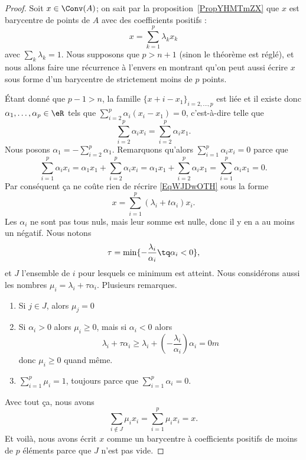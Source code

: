 \begin{proof}
	Soit \( x\in\Conv(A)\); on sait par la proposition~\ref{PropYHMTmZX} que \( x\) est barycentre de points de \( A\) avec des coefficients positifs :
	\begin{equation}    \label{EqWJDwOTH}
		x=\sum_{k=1}^p\lambda_kx_k
	\end{equation}
	avec \( \sum_k\lambda_k=1\). Nous supposons que \( p>n+1\) (sinon le théorème est réglé), et nous allons faire une récurrence à l'envers en montrant qu'on peut aussi écrire \( x\) sous forme d'un barycentre de strictement moins de \( p\) points.

	Étant donné que \( p-1>n\), la famille \( \{ x+i-x_1 \}_{i=2,\ldots, p}\) est liée et il existe donc \( \alpha_1,\ldots, \alpha_p\in \eR\) tels que \( \sum_{i=2}^p\alpha_i(x_i-x_1)=0\), c'est-à-dire telle que
	\begin{equation}
		\sum_{i=2}^p\alpha_ix_i=\sum_{i=2}^p\alpha_ix_1.
	\end{equation}
	Nous posons \( \alpha_1=-\sum_{i=2}^p\alpha_1\). Remarquons qu'alors \( \sum_{i=1}^p\alpha_ix_i=0\) parce que
	\begin{equation}
		\sum_{i=1}^p\alpha_ix_i=\alpha_1x_1+\sum_{i=2}^p\alpha_ix_i=\alpha_1x_1+\sum_{i=2}^p\alpha_ix_1=\sum_{i=1}^p\alpha_ix_1=0.
	\end{equation}
	Par conséquent ça ne coûte rien de récrire \eqref{EqWJDwOTH} sous la forme
	\begin{equation}
		x=\sum_{i=1}^p(\lambda_i+t\alpha_i)x_i.
	\end{equation}
	Les \( \alpha_i\) ne sont pas tous nuls, mais leur somme est nulle, donc il y en a au moins un négatif. Nous notons
	\begin{equation}
		\tau=\min\{ -\frac{ \lambda_i }{ \alpha_i }\tq \alpha_i<0 \},
	\end{equation}
	et \( J\) l'ensemble de \( i\) pour lesquels ce minimum est atteint. Nous considérons aussi les nombres \( \mu_i=\lambda_i+\tau\alpha_i\). Plusieurs remarques.
	\begin{enumerate}
		\item
		      Si \( j\in J\), alors \( \mu_j=0\)
		\item
		      Si \( \alpha_i>0\) alors \( \mu_i\geq 0\), mais si \( \alpha_i<0\) alors
		      \begin{equation}
			      \lambda_i+\tau\alpha_i\geq \lambda_i+(-\frac{ \lambda_i }{ \alpha_i })\alpha_i=0m
		      \end{equation}
		      donc \( \mu_i\geq 0\) quand même.
		\item
		      \( \sum_{i=1}^p\mu_i=1\), toujours parce que \( \sum_{i=1}^p\alpha_i=0\).
	\end{enumerate}
	Avec tout ça, nous avons
	\begin{equation}
		\sum_{i\notin J}\mu_ix_i=\sum_{i=1}^p\mu_ix_i=x.
	\end{equation}
	Et voilà, nous avons écrit \( x\) comme un barycentre à coefficients positifs de moins de \( p\) éléments parce que \( J\) n'est pas vide.
\end{proof}

